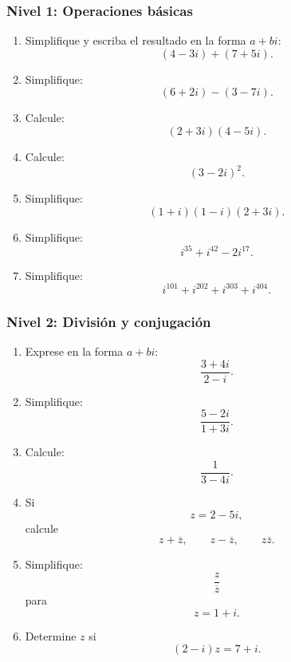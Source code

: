 \subsubsection*{Nivel 1: Operaciones básicas}

\begin{enumerate}

\item Simplifique y escriba el resultado en la forma $a+bi$:
\[
(4-3i)+(7+5i).
\]

\item Simplifique:
\[
(6+2i)-(3-7i).
\]

\item Calcule:
\[
(2+3i)(4-5i).
\]

\item Calcule:
\[
(3-2i)^2.
\]

\item Simplifique:
\[
(1+i)(1-i)(2+3i).
\]

\item Simplifique:
\[
i^{35}+i^{42}-2i^{17}.
\]

\item Simplifique:
\[
i^{101}+i^{202}+i^{303}+i^{404}.
\]

\end{enumerate}


\subsubsection*{Nivel 2: División y conjugación}

\begin{enumerate}

\item Exprese en la forma $a+bi$:
\[
\frac{3+4i}{2-i}.
\]

\item Simplifique:
\[
\frac{5-2i}{1+3i}.
\]

\item Calcule:
\[
\frac{1}{3-4i}.
\]

\item Si
\[
z=2-5i,
\]
calcule
\[
z+\overline z,\qquad
z-\overline z,\qquad
z\overline z.
\]

\item Simplifique:
\[
\frac{z}{\overline z}
\]
para
\[
z=1+i.
\]

\item Determine $z$ si
\[
(2-i)z=7+i.
\]

\end{enumerate}


